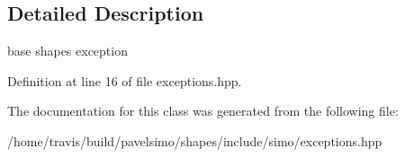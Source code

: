 \subsection{Detailed Description}
base shapes exception 

Definition at line 16 of file exceptions.\-hpp.



The documentation for this class was generated from the following file\-:\begin{DoxyCompactItemize}
\item 
/home/travis/build/pavelsimo/shapes/include/simo/exceptions.\-hpp\end{DoxyCompactItemize}
